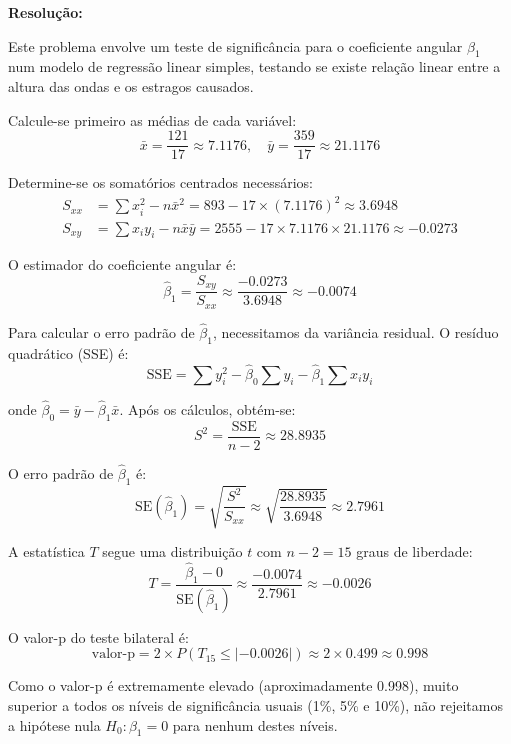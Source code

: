 \documentclass[a4paper,12pt]{article}
\begin{document}
\begin{enumerate}
    \begin{mdframed}[backgroundcolor=gray!10,linewidth=0pt,innertopmargin=10pt,innerbottommargin=10pt]
    \textbf{Resolução:}

    Este problema envolve um teste de significância para o coeficiente angular $\beta_1$ num modelo de regressão linear simples, testando se existe relação linear entre a altura das ondas e os estragos causados.

    Calcule-se primeiro as médias de cada variável:
    \[
    \bar{x} = \frac{121}{17} \approx 7.1176, \quad \bar{y} = \frac{359}{17} \approx 21.1176
    \]

    Determine-se os somatórios centrados necessários:
    \begin{align*}
    S_{xx} &= \sum x_i^2 - n\bar{x}^2 = 893 - 17 \times (7.1176)^2 \approx 3.6948 \\
    S_{xy} &= \sum x_i y_i - n\bar{x}\bar{y} = 2555 - 17 \times 7.1176 \times 21.1176 \approx -0.0273
    \end{align*}

    O estimador do coeficiente angular é:
    \[
    \hat{\beta}_1 = \frac{S_{xy}}{S_{xx}} \approx \frac{-0.0273}{3.6948} \approx -0.0074
    \]

    Para calcular o erro padrão de $\hat{\beta}_1$, necessitamos da variância residual. O resíduo quadrático (SSE) é:
    \[
    \text{SSE} = \sum y_i^2 - \hat{\beta}_0 \sum y_i - \hat{\beta}_1 \sum x_i y_i
    \]

    onde $\hat{\beta}_0 = \bar{y} - \hat{\beta}_1 \bar{x}$. Após os cálculos, obtém-se:
    \[
    S^2 = \frac{\text{SSE}}{n-2} \approx 28.8935
    \]

    O erro padrão de $\hat{\beta}_1$ é:
    \[
    \text{SE}(\hat{\beta}_1) = \sqrt{\frac{S^2}{S_{xx}}} \approx \sqrt{\frac{28.8935}{3.6948}} \approx 2.7961
    \]

    A estatística $T$ segue uma distribuição $t$ com $n-2 = 15$ graus de liberdade:
    \[
    T = \frac{\hat{\beta}_1 - 0}{\text{SE}(\hat{\beta}_1)} \approx \frac{-0.0074}{2.7961} \approx -0.0026
    \]

    O valor-p do teste bilateral é:
    \[
    \text{valor-p} = 2 \times P(T_{15} \leq |-0.0026|) \approx 2 \times 0.499 \approx 0.998
    \]

    Como o valor-p é extremamente elevado (aproximadamente 0.998), muito superior a todos os níveis de significância usuais (1\%, 5\% e 10\%), não rejeitamos a hipótese nula $H_0: \beta_1 = 0$ para nenhum destes níveis.


\end{mdframed}
\end{enumerate}
\end{document}
